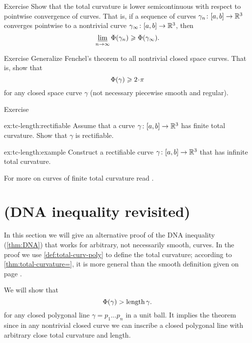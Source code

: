 \begin{thm}{Exercise}\label{ex:tc-semicontinuous}
Show that the total curvature is lower semicontinuous with respect to pointwise convergence of curves.
That is, if a sequence
of curves $\gamma_n\colon[a,b]\to \mathbb{R}^3$ converges pointwise 
to a nontrivial curve $\gamma_\infty\:[a,b]\z\to \RR^3$, then 
\[\varliminf_{n\to\infty} \Phi({\gamma_n}) \geqslant \Phi({\gamma_\infty}).\]
\end{thm}


\begin{thm}{Exercise}\label{ex:gen-fenchel}
Generalize Fenchel's theorem to all nontrivial closed space curves.
That is, show that \[\tc\gamma\ge2\cdot\pi\]
for any  closed space curve $\gamma$ (not necessary piecewise smooth and regular).
\end{thm}

\begin{thm}{Exercise}\label{ex:tc-length}

\begin{subthm}{ex:tc-length:rectifiable}
Assume that a curve $\gamma\colon[a,b]\to\mathbb{R}^3$ has finite total curvature.
Show that $\gamma$ is rectifiable.
\end{subthm}

\begin{subthm}{ex:tc-length:example}
Construct a rectifiable curve $\gamma\colon[a,b]\to\mathbb{R}^3$ that has infinite total curvature.
\end{subthm}

\end{thm}

For more on curves of finite total curvature read \cite{aleksandrov-reshetnyak,sullivan-curves}. 

\section{(DNA inequality revisited)}

In this section we will give an alternative proof of the DNA inequality (\ref{thm:DNA}) that works for arbitrary, not necessarily smooth, curves.
In the proof we use \ref{def:total-curv-poly} to define the total curvature;
according to \ref{thm:total-curvature=}, it is more general than the smooth definition given on page \pageref{page:total curvature of:smooth-def}.

We will show that 
\[\Phi({\gamma})> \mathop{\rm length}\nolimits\gamma.\]
for any closed polygonal line $\gamma=p_1\dots p_{n}$ in a unit ball.
It implies the theorem since in any nontrivial closed curve we can inscribe a closed polygonal line with arbitrary close total curvature and length.

